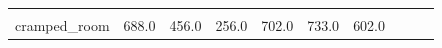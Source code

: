 \begin{table}[t]
\begin{center}
\begin{tabular}{llllllllll}
           
           

        
           &
           
           
           

        
           &
           
           
           

        
           &
           
           
           

        
           &
           
           
           

        
           &
           
           
           

        
           &
           
           
           

        
           &
           
           
           

         \\

        cramped_room
        
           &
           
           688.0
           

        
           &
           
           456.0
           

        
           &
           
           256.0
           

        
           &
           
           702.0
           

        
           &
           
           733.0
           

        
           &
           
           602.0
           

        
           &
           

\end{tabular}
\end{center}
\end{table}
